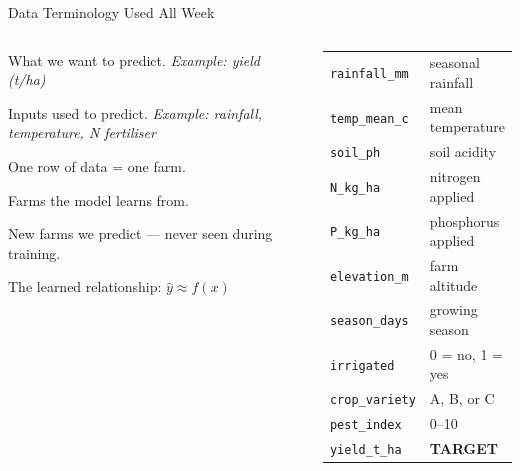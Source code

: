 \documentclass[aspectratio=169,10pt]{beamer}
\begin{document}
\begin{frame}{Data Terminology Used All Week}
  \begin{columns}
      \begin{description}
        \item[\bfemph{Target} ($y$)]
          What we want to predict.
          \textit{Example: yield (t/ha)}
        \item[\bfemph{Features} ($x_1 \ldots x_p$)]
          Inputs used to predict.
          \textit{Example: rainfall, temperature, N fertiliser}
        \item[\bfemph{Observation}]
          One row of data = one farm.
        \item[\bfemph{Training data}]
          Farms the model learns from.
        \item[\bfemph{Test data}]
          New farms we predict --- never seen during training.
        \item[\bfemph{Model}]
          The learned relationship: $\hat{y} \approx f(x)$
      \end{description}
      \begin{tcolorbox}[mybox,title={\small\bfseries \dataset{} Feature List}]
        \footnotesize
        \begin{tabular}{ll}
          \texttt{rainfall\_mm}  & seasonal rainfall \\
          \texttt{temp\_mean\_c} & mean temperature \\
          \texttt{soil\_ph}      & soil acidity \\
          \texttt{N\_kg\_ha}     & nitrogen applied \\
          \texttt{P\_kg\_ha}     & phosphorus applied \\
          \texttt{elevation\_m}  & farm altitude \\
          \texttt{season\_days}  & growing season \\
          \texttt{irrigated}     & 0 = no, 1 = yes \\
          \texttt{crop\_variety} & A, B, or C \\
          \texttt{pest\_index}   & 0--10 \\
          \midrule
          \texttt{yield\_t\_ha}  & \textbf{TARGET} \\
        \end{tabular}
      \end{tcolorbox}
  \end{columns}
\end{frame}
\end{document}
